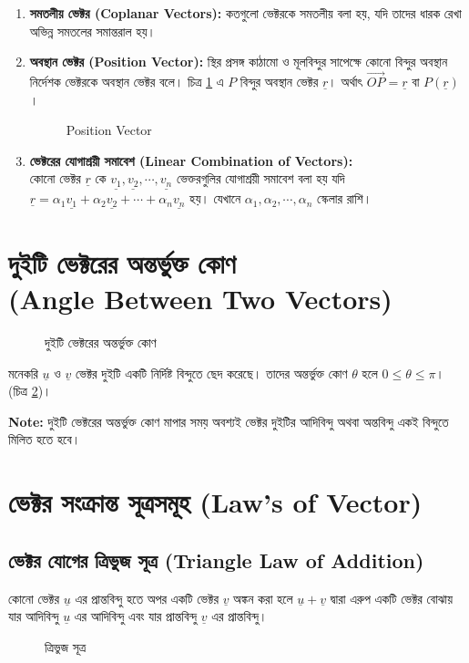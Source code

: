 \begin{enumerate}
	\newpage
	\item \textbf{সমতলীয় ভেক্টর (Coplanar Vectors):} কতগুলো ভেক্টরকে সমতলীয় বলা হয়, যদি তাদের ধারক রেখা অভিন্ন সমতলের সমান্তরাল হয়।
	
	\item \textbf{অবস্থান ভেক্টর (Position Vector):} স্থির প্রসঙ্গ কাঠামো ও মূলবিন্দুর সাপেক্ষে কোনো বিন্দুর অবস্থান নির্দেশক ভেক্টরকে অবস্থান ভেক্টর বলে। চিত্র \ref{vec-fig-5} এ $P$ বিন্দুর অবস্থান ভেক্টর $\underline{r}$। অর্থাৎ $\overrightarrow{OP}=\underline{r}$ বা $P(\underline{r})$। 
	\begin{figure}[h]
		\centering
		
		\caption{Position Vector}
		\label{vec-fig-5}
	\end{figure}

	\item \textbf{ভেক্টরের যোগাশ্রয়ী সমাবেশ (Linear Combination of Vectors):}\\ কোনো ভেক্টর $\underline{r}$ কে $\underline{v_1}, \underline{v_2}, \cdots, \underline{v_n}$ ভেক্তরগুলির যোগাশ্রয়ী সমাবেশ বলা হয় যদি\\ $\underline{r}=\alpha_1\underline{v_1}+\alpha_2\underline{v_2}+\cdots+\alpha_n\underline{v_n}$ হয়। যেখানে $\alpha_1, \alpha_2, \cdots, \alpha_n$ স্কেলার রাশি। 
\end{enumerate}
\newpage
\section*{দুইটি ভেক্টরের অন্তর্ভুক্ত কোণ \\(Angle Between Two Vectors)}
\begin{figure}[h]
	\centering
	
	\caption{দুইটি ভেক্টরের অন্তর্ভুক্ত কোণ}
	\label{vec-fig-6}
\end{figure}
মনেকরি $\underline{u}$ ও $\underline{v}$ ভেক্টর দুইটি একটি নির্দিষ্ট বিন্দুতে ছেদ করেছে। তাদের অন্তর্ভুক্ত কোণ $\theta$ হলে $0\leq\theta\leq\pi$। (চিত্র \ref{vec-fig-6})।   
\begin{tcolorbox}
	\textbf{Note:} দুইটি ভেক্টরের অন্তর্ভুক্ত কোণ মাপার সময় অবশ্যই ভেক্টর দুইটির আদিবিন্দু অথবা অন্তবিন্দু একই বিন্দুতে মিলিত হতে হবে। 
\end{tcolorbox}
\section*{ভেক্টর সংক্রান্ত সূত্রসমূহ (Law's of Vector)}
\subsection*{ভেক্টর যোগের ত্রিভুজ সূত্র (Triangle Law of Addition)}
\begin{tcolorbox}[colback=green!5!white,colframe=green!75!black,title=ত্রিভুজ সূত্র]
	কোনো ভেক্টর $\underline{u}$ এর প্রান্তবিন্দু হতে অপর একটি ভেক্টর $\underline{v}$ অঙ্কন করা হলে $\underline{u}+\underline{v}$ দ্বারা এরুপ একটি ভেক্টর বোঝায় যার আদিবিন্দু $\underline{u}$ এর আদিবিন্দু এবং যার প্রান্তবিন্দু $\underline{v}$ এর প্রান্তবিন্দু।
\end{tcolorbox}
\begin{figure}[h]
	\centering
	
	\caption{ত্রিভুজ সূত্র}
	\label{vec-fig-7}
\end{figure} 

